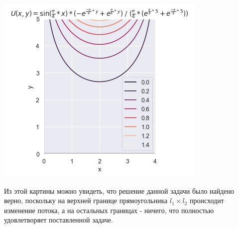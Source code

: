 \includegraphics[width=0.8\linewidth]{Dirihle.PNG}

Из этой картины можно увидеть, что решение данной задачи было найдено верно, поскольку на верхней границе прямоугольника $l_{1}\times l_{2}$ происходит изменение потока, а на остальных границах - ничего, что полностью удовлетворяет поставленной задаче.

\pagebreak